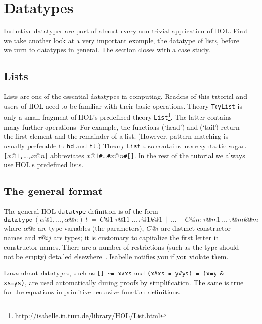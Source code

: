 \section{Datatypes}
\label{sec:datatype}

Inductive datatypes are part of almost every non-trivial application of HOL.
First we take another look at a very important example, the datatype of
lists, before we turn to datatypes in general. The section closes with a
case study.


\subsection{Lists}

Lists are one of the essential datatypes in computing. Readers of this
tutorial and users of HOL need to be familiar with their basic operations.
Theory \texttt{ToyList} is only a small fragment of HOL's predefined theory
\texttt{List}\footnote{\url{http://isabelle.in.tum.de/library/HOL/List.html}}.
The latter contains many further operations. For example, the functions
 (`head') and  (`tail') return the first
element and the remainder of a list. (However, pattern-matching is usually
preferable to \texttt{hd} and \texttt{tl}.)  Theory \texttt{List} also
contains more syntactic sugar:
\texttt{[}$x@1$\texttt{,}\dots\texttt{,}$x@n$\texttt{]} abbreviates
$x@1$\texttt{\#}\dots\texttt{\#}$x@n$\texttt{\#[]}.  In the rest of the
tutorial we always use HOL's predefined lists.


\subsection{The general format}
\label{sec:general-datatype}

The general HOL \texttt{datatype} definition is of the form
\[
\mathtt{datatype}~(\alpha@1, \dots, \alpha@n) \, t ~=~
C@1~\tau@{11}~\dots~\tau@{1k@1} ~\mid~ \dots ~\mid~
C@m~\tau@{m1}~\dots~\tau@{mk@m}
\]
where $\alpha@i$ are type variables (the parameters), $C@i$ are distinct
constructor names and $\tau@{ij}$ are types; it is customary to capitalize
the first letter in constructor names. There are a number of
restrictions (such as the type should not be empty) detailed
elsewhere~\cite{isabelle-HOL}. Isabelle notifies you if you violate them.

Laws about datatypes, such as \verb$[] ~= x#xs$ and \texttt{(x\#xs = y\#ys) =
  (x=y \& xs=ys)}, are used automatically during proofs by simplification.
The same is true for the equations in primitive recursive function
definitions.

